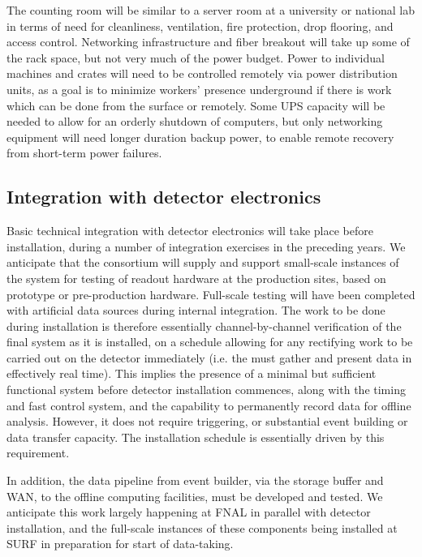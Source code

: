 The counting room will be similar to a server room at a university or national lab in terms of need for cleanliness, ventilation, fire protection, drop flooring, and access control. Networking infrastructure and fiber breakout will take up some of the rack space, but not very much of the power budget. Power to individual machines and crates will need to be controlled remotely via power distribution units, as a goal is to minimize  workers' presence underground if there is work which can be done from the surface or remotely.  Some UPS capacity will be needed to allow for an orderly shutdown of computers, but only networking equipment will need longer duration backup power, to enable remote recovery from short-term power failures.  

\subsection{Integration with detector electronics}
\label{sec:fdsp-daq-install-transport}

Basic technical integration with detector electronics will take place before installation, during a number of integration exercises in the preceding years. We anticipate that the consortium will supply and support small-scale instances of the  system for testing of readout hardware at the production sites, based on prototype or pre-production hardware. Full-scale  testing will have been completed with artificial data sources during internal integration. The work to be done during installation is therefore essentially channel-by-channel verification of the final system as it is installed, on a schedule allowing for any rectifying work to be carried out on the detector immediately (i.e. the  must gather and present data in effectively real time). This implies the presence of a minimal but sufficient functional  system before detector installation commences, along with the timing and fast control system, and the capability to permanently record data for offline analysis. However, it does not require triggering, or substantial event building or data transfer capacity. The  installation schedule is essentially driven by this requirement.

In addition, the data pipeline from event builder, via the storage buffer and WAN, to the offline computing facilities, must be developed and tested. We anticipate this work largely happening at FNAL in parallel with detector installation, and the full-scale instances of these components being installed at SURF in preparation for start of data-taking.

